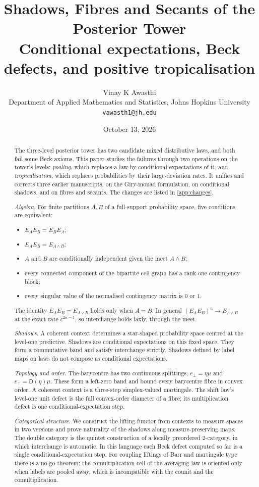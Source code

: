 \documentclass[11pt]{article}
\title{\textbf{Shadows, Fibres and Secants of the Posterior Tower}\\[.4em]
\large Conditional expectations, Beck defects, and positive tropicalisation}
\author{Vinay K Awasthi\\ Department of Applied Mathematics and Statistics, Johns Hopkins University\\ \texttt{vawasth1@jh.edu}}
\date{October 13, 2026}
\theoremstyle{definition}
\newcommand{\D}{\mathsf D}
\newcommand{\ebot}{e_{\perp}}
\newcommand{\etop}{e_{\top}}
\begin{document}
\maketitle

\begin{abstract}
The three-level posterior tower \cite{Tower} has two candidate mixed distributive laws, and both fail some Beck axioms. This paper
studies the failures through two operations on the tower's levels: \emph{pooling}, which replaces a law by conditional expectations of
it, and \emph{tropicalisation}, which replaces probabilities by their large-deviation rates. It unifies and corrects three earlier
manuscripts, on the Giry-monad formulation, on conditional shadows, and on fibres and secants. The changes are listed in
\cref{app:changes}.

\emph{Algebra.} For finite partitions $A,B$ of a full-support probability space, five conditions are equivalent:
\begin{itemize}
\item $E_AE_B=E_BE_A$;
\item $E_AE_B=E_{A\wedge B}$;
\item $A$ and $B$ are conditionally independent given the meet $A\wedge B$;
\item every connected component of the bipartite cell graph has a rank-one contingency block;
\item every singular value of the normalised contingency matrix is $0$ or $1$.
\end{itemize}
The identity $E_AE_B=E_{A\vee B}$ holds only when $A=B$. In general $(E_AE_B)^n\to E_{A\wedge B}$ at the exact rate $c^{2n-1}$, so
interchange holds laxly, through the meet.

\emph{Shadows.} A coherent context determines a star-shaped probability space centred at the level-one predictive. Shadows are
conditional expectations on this fixed space. They form a commutative band and satisfy interchange strictly. Shadows defined by
label maps on laws do not compose as conditional expectations.

\emph{Topology and order.} The barycentre has two continuous splittings, $\ebot=\eta\mu$ and $\etop=\D(\eta)\mu$. These form a
left-zero band and bound every barycentre fibre in convex order. A coherent context is a three-step simplex-valued martingale. The
shift law's level-one unit defect is the full convex-order diameter of a fibre; its multiplication defect is one
conditional-expectation step.

\emph{Categorical structure.} We construct the lifting functor from contexts to measure spaces in two versions and prove naturality of
the shadows along measure-preserving maps. The double category is the quintet construction of a locally preordered 2-category, in
which interchange is automatic. In this language each Beck defect computed so far is a single conditional-expectation step. For coupling liftings of Barr and martingale type there is a no-go theorem: the comultiplication cell of the averaging law is oriented
only when labels are pooled away, which is incompatible with the counit and the comultiplication.


\end{abstract}
\end{document}

